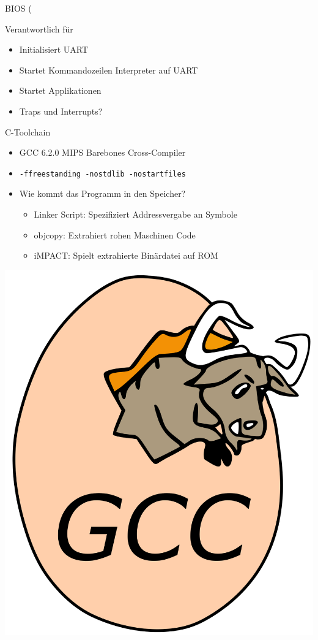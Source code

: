 \begin{frame}{BIOS (}

Verantwortlich für

\begin{itemize}
\item Initialisiert UART
\item Startet Kommandozeilen Interpreter auf UART
\item Startet Applikationen
\item Traps und Interrupts?
\pause
\end{itemize}

\end{frame}

\begin{frame}{C-Toolchain}

\begin{itemize}
\item GCC 6.2.0 MIPS Barebones Cross-Compiler
\item \texttt{-ffreestanding -nostdlib -nostartfiles}
\item Wie kommt das Programm in den Speicher?
\begin{itemize}
    \item Linker Script: Spezifiziert Addressvergabe an Symbole
    \item objcopy: Extrahiert rohen Maschinen Code
    \item iMPACT: Spielt extrahierte Binärdatei auf ROM
\end{itemize}
\end{itemize}
\begin{center}
\includegraphics[scale=0.10]{gcc.png}
\end{center}


\end{frame}

